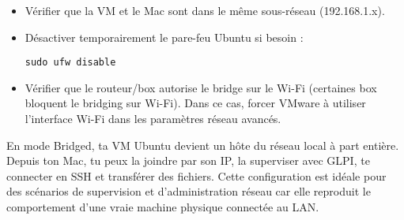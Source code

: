 \documentclass[11pt,a4paper]{article}
\begin{document}
\begin{tcolorbox}[title={6. Points à vérifier en cas de problème}]
\begin{itemize}
  \item Vérifier que la VM et le Mac sont dans le même sous-réseau (192.168.1.x).  
  \item Désactiver temporairement le pare-feu Ubuntu si besoin :
\begin{verbatim}
sudo ufw disable
\end{verbatim}
  \item Vérifier que le routeur/box autorise le bridge sur le Wi-Fi (certaines box bloquent le bridging sur Wi-Fi). Dans ce cas, forcer VMware à utiliser l’interface Wi-Fi dans les paramètres réseau avancés.
\end{itemize}
\end{tcolorbox}

\begin{tcolorbox}[title={Conclusion}]
En mode Bridged, ta VM Ubuntu devient un hôte du réseau local à part entière.  
Depuis ton Mac, tu peux la joindre par son IP, la superviser avec GLPI, te connecter en SSH et transférer des fichiers.  
Cette configuration est idéale pour des scénarios de supervision et d’administration réseau car elle reproduit le comportement d’une vraie machine physique connectée au LAN.
\end{tcolorbox}
\end{document}
